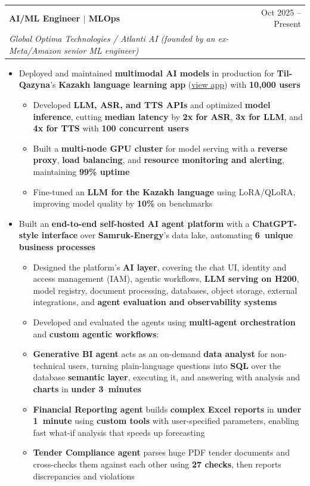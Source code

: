 \documentclass[letterpaper,11pt]{article}
\makeatletter
\newcommand{\resumeItem}[1]{
  \item\small{
    {#1 \vspace{-2pt}}
  }
}
\newcommand{\resumeSubheading}[4]{
  \vspace{-2pt}\item
    \begin{tabular*}{0.97\textwidth}[t]{l@{\extracolsep{\fill}}r}
      \textbf{#1} & #2 \\
      \textit{\small#3} & \textit{\small #4} \\
    \end{tabular*}\vspace{-7pt}
}
\newcommand{\resumeItemListStart}{\begin{itemize}}
\newcommand{\resumeItemListEnd}{\end{itemize}\vspace{-5pt}}
\newcommand{\resumeSubItemListStart}{\begin{itemize}[label={$\vcenter{\hbox{\tiny$\circ$}}$}, topsep=0pt, partopsep=0pt]}
\newcommand{\resumeSubItemListEnd}{\end{itemize}}
\makeatother
\begin{document}
    \resumeSubheading
      {AI/ML Engineer $|$ MLOps}{Oct 2025 -- Present}
      {Global Optima Technologies / Atlanti AI (founded by an ex-Meta/Amazon senior ML engineer)}{}
      \resumeItemListStart
        \resumeItem{Deployed and maintained \textbf{multimodal AI models} in production for \textbf{Til-Qazyna}'s \textbf{Kazakh language learning app} (\href{https://itutor.tilqazyna.kz/}{\underline{view app}}) with \textbf{10,000 users}}
        \resumeSubItemListStart
          \resumeItem{Developed \textbf{LLM, ASR, and TTS APIs} and optimized \textbf{model inference}, cutting \textbf{median latency} by \textbf{2x for ASR}, \textbf{3x for LLM}, and \textbf{4x for TTS} with \textbf{100 concurrent users}}
          \resumeItem{Built a \textbf{multi-node GPU cluster} for model serving with a \textbf{reverse proxy}, \textbf{load balancing}, and \textbf{resource monitoring and alerting}, maintaining \textbf{99\% uptime}}
          \resumeItem{Fine-tuned an \textbf{LLM for the Kazakh language} using LoRA/QLoRA, improving model quality by \textbf{10\%} on benchmarks}
        \resumeSubItemListEnd
        \resumeItem{Built an \textbf{end-to-end self-hosted AI agent platform} with a \textbf{ChatGPT-style interface} over \textbf{Samruk-Energy}'s data lake, automating \textbf{6~unique business processes}}
        \resumeSubItemListStart
          \resumeItem{Designed the platform's \textbf{AI layer}, covering the chat UI, identity and access management (IAM), agentic workflows, \textbf{LLM serving on H200}, model registry, document processing, databases, object storage, external integrations, and \textbf{agent evaluation and observability systems}}
          \resumeItem{Developed and evaluated the agents using \textbf{multi-agent orchestration} and \textbf{custom agentic workflows}:}
          \resumeItem{\textbf{Generative BI agent} acts as an on-demand \textbf{data analyst} for non-technical users, turning plain-language questions into \textbf{SQL} over the database \textbf{semantic layer}, executing it, and answering with analysis and \textbf{charts} in \textbf{under 3~minutes}}
          \resumeItem{\textbf{Financial Reporting agent} builds \textbf{complex Excel reports} in \textbf{under 1~minute} using \textbf{custom tools} with user-specified parameters, enabling fast what-if analysis that speeds up forecasting}
          \resumeItem{\textbf{Tender Compliance agent} parses huge PDF tender documents and cross-checks them against each other using \textbf{27 checks}, then reports discrepancies and violations}
        \resumeSubItemListEnd
      \resumeItemListEnd
\end{document}
